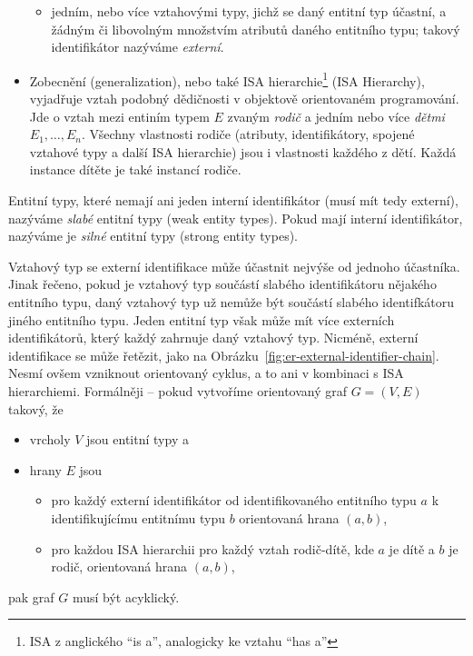 \begin{itemize}
\begin{itemize}
          \item jedním, nebo více vztahovými typy, jichž se daný entitní typ účastní, a žádným či libovolným množstvím atributů daného entitního typu; takový identifikátor nazýváme \emph{externí}.
        \end{itemize}
  \item Zobecnění (generalization), nebo také ISA hierarchie\footnote{ISA z anglického \enquote{is a}, analogicky ke vztahu \enquote{has a}} (ISA Hierarchy), vyjadřuje vztah podobný dědičnosti v objektově orientovaném programování.
        Jde o vztah mezi entiním typem $E$ zvaným \emph{rodič} a jedním nebo více \emph{dětmi} $E_1, \dots, E_n$.
        Všechny vlastnosti rodiče (atributy, identifikátory, spojené vztahové typy a další ISA hierarchie) jsou i vlastnosti každého z dětí.
        Každá instance dítěte je také instancí rodiče.
\end{itemize}

Entitní typy, které nemají ani jeden interní identifikátor (musí mít tedy externí), nazýváme \emph{slabé} entitní typy (weak entity types).
Pokud mají interní identifikátor, nazýváme je \emph{silné} entitní typy (strong entity types).

Vztahový typ se externí identifikace může účastnit nejvýše od jednoho účastníka.
Jinak řečeno, pokud je vztahový typ součástí slabého identifikátoru nějakého entitního typu, daný vztahový typ už nemůže být součástí slabého identifkátoru jiného entitního typu.
Jeden entitní typ však může mít více externích identifikátorů, který každý zahrnuje daný vztahový typ.
Nicméně, externí identifikace se může řetězit, jako na Obrázku~\ref{fig:er-external-identifier-chain}.
Nesmí ovšem vzniknout orientovaný cyklus, a to ani v kombinaci s ISA hierarchiemi.
Formálněji -- pokud vytvoříme orientovaný graf $G=(V,E)$ takový, že
\begin{itemize}
  \item vrcholy $V$ jsou entitní typy a
  \item hrany $E$ jsou
        \begin{itemize}
          \item pro každý externí identifikátor od identifikovaného entitního typu $a$ k identifikujícímu entitnímu typu $b$ orientovaná hrana $(a, b)$,
          \item pro každou ISA hierarchii pro každý vztah rodič-dítě, kde $a$ je dítě a $b$ je rodič, orientovaná hrana $(a, b)$,
        \end{itemize}
\end{itemize}
pak graf $G$ musí být acyklický.

